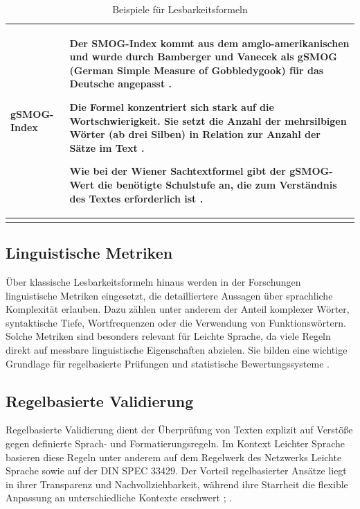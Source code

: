 \begin{longtable}{|p{}|p{}|}
	gSMOG-Index & 
	Der SMOG-Index kommt aus dem amglo-amerikanischen und wurde durch Bamberger und Vanecek als gSMOG  (German Simple Measure of Gobbledygook) für das Deutsche angepasst \cite[S. 442]{pedrini_medical_2024}.
	
	Die Formel konzentriert sich stark auf die Wortschwierigkeit. Sie setzt die Anzahl der mehrsilbigen Wörter (ab drei Silben) in Relation zur Anzahl der Sätze im Text \cite[S. 442]{pedrini_medical_2024}.
	
	Wie bei der Wiener Sachtextformel gibt der gSMOG-Wert die benötigte Schulstufe an, die zum Verständnis des Textes erforderlich ist \cite[S. 442]{pedrini_medical_2024}.\\
	\hline
	\caption{Beispiele für Lesbarkeitsformeln}
\end{longtable}
\clearpage

\subsection{Linguistische Metriken}
Über klassische Lesbarkeitsformeln hinaus werden in der Forschungen linguistische Metriken eingesetzt, die detailliertere Aussagen über sprachliche Komplexität erlauben.
Dazu zählen unter anderem der Anteil komplexer Wörter, syntaktische Tiefe, Wortfrequenzen oder die Verwendung von Funktionswörtern.
Solche Metriken sind besonders relevant für Leichte Sprache, da viele Regeln direkt auf messbare linguistische Eigenschaften abzielen.
Sie bilden eine wichtige Grundlage für regelbasierte Prüfungen und statistische Bewertungssysteme \cite[S. 87-94]{maas_handbuch_2018}.

\subsection{Regelbasierte Validierung}
Regelbasierte Validierung dient der Überprüfung von Texten explizit auf Verstöße gegen definierte Sprach- und Formatierungsregeln. 
Im Kontext Leichter Sprache basieren diese Regeln unter anderem auf dem Regelwerk des Netzwerks Leichte Sprache sowie auf der DIN SPEC 33429.
Der Vorteil regelbasierter Ansätze liegt in ihrer Transparenz und Nachvollziehbarkeit, während ihre Starrheit die flexible Anpassung an unterschiedliche Kontexte erschwert \cite[S. 5-14]{DINSPEC334292019}; \cite{naber_rule-based_nodate}.

